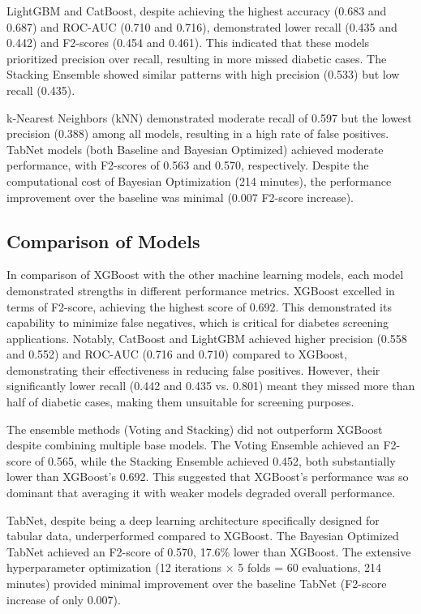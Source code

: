 LightGBM and CatBoost, despite achieving the highest accuracy (0.683 and 0.687) and ROC-AUC (0.710 and 0.716), demonstrated lower recall (0.435 and 0.442) and F2-scores (0.454 and 0.461). This indicated that these models prioritized precision over recall, resulting in more missed diabetic cases. The Stacking Ensemble showed similar patterns with high precision (0.533) but low recall (0.435).

k-Nearest Neighbors (kNN) demonstrated moderate recall of 0.597 but the lowest precision (0.388) among all models, resulting in a high rate of false positives. TabNet models (both Baseline and Bayesian Optimized) achieved moderate performance, with F2-scores of 0.563 and 0.570, respectively. Despite the computational cost of Bayesian Optimization (214 minutes), the performance improvement over the baseline was minimal (0.007 F2-score increase).

\subsection{Comparison of Models}

In comparison of XGBoost with the other machine learning models, each model demonstrated strengths in different performance metrics. XGBoost excelled in terms of F2-score, achieving the highest score of 0.692. This demonstrated its capability to minimize false negatives, which is critical for diabetes screening applications. Notably, CatBoost and LightGBM achieved higher precision (0.558 and 0.552) and ROC-AUC (0.716 and 0.710) compared to XGBoost, demonstrating their effectiveness in reducing false positives. However, their significantly lower recall (0.442 and 0.435 vs. 0.801) meant they missed more than half of diabetic cases, making them unsuitable for screening purposes.

The ensemble methods (Voting and Stacking) did not outperform XGBoost despite combining multiple base models. The Voting Ensemble achieved an F2-score of 0.565, while the Stacking Ensemble achieved 0.452, both substantially lower than XGBoost's 0.692. This suggested that XGBoost's performance was so dominant that averaging it with weaker models degraded overall performance.

TabNet, despite being a deep learning architecture specifically designed for tabular data, underperformed compared to XGBoost. The Bayesian Optimized TabNet achieved an F2-score of 0.570, 17.6\% lower than XGBoost. The extensive hyperparameter optimization (12 iterations $\times$ 5 folds = 60 evaluations, 214 minutes) provided minimal improvement over the baseline TabNet (F2-score increase of only 0.007).

